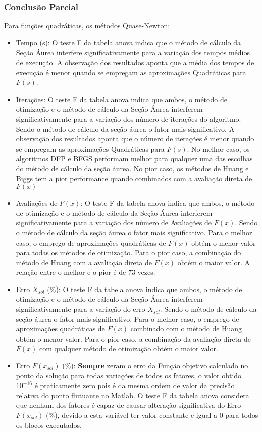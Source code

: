 \subsubsection{Conclusão Parcial}
        Para funções quadráticas, os métodos Quase-Newton:
        \begin{itemize}
            \item {Tempo (s):} O teste F da tabela anova indica que o método de cálculo da Seção Áurea interfere significativamente para a variação dos tempos médios de execução. A observação dos resultados aponta que a média dos tempos de execução é menor quando se empregam as aproximações Quadráticas para $F(s)$.
            \item {Iterações:} O teste F da tabela anova indica que ambos, o método de otimização e o método de cálculo da Seção Áurea interferem significativamente para a variação dos número de iterações do algoritmo. Sendo o método de cálculo da seção áurea o fator mais significativo. A observação dos resultados aponta que o número de iterações é menor quando se empregam as aproximações Quadráticas para $F(s)$. No melhor caso, os algoritmos DFP e BFGS performam melhor para qualquer uma das escolhas do método de cálculo da seção áurea. No pior caso, os métodos de Huang e Biggs tem a pior performance quando combinados com a avaliação direta de $F(x)$
            \item {Avaliações de $F(x)$:} O teste F da tabela anova indica que ambos, o método de otimização e o método de cálculo da Seção Áurea interferem significativamente para a variação dos número de Avaliações de $F(x)$. Sendo o método de cálculo da seção áurea o fator mais significativo. Para o melhor caso, o emprego de aproximações quadráticas de $F(x)$ obtém o menor valor para todas os métodos de otimização. Para o pior caso, a combinação do método de Huang com a avaliação direta de $F(x)$ obtém o maior valor. A relação entre o melhor e o pior é de 73 vezes.
            \item {Erro $X_{sol}$ (\%):} O teste F da tabela anova indica que ambos, o método de otimização e o método de cálculo da Seção Áurea interferem significativamente para a variação do erro $X_{sol}$. Sendo o método de cálculo da seção áurea o fator mais significativo. Para o melhor caso, o emprego de aproximações quadráticas de $F(x)$ combinado com o método de Huang obtém o menor valor. Para o pior caso, a combinação da avaliação direta de $F(x)$ com qualquer método de otimização obtém o maior valor.
            \item {Erro $F(x_{sol})$ (\%):} \textbf{Sempre} zeram o erro da Função objetivo calculado no ponto da solução para todas variações de todos os fatores, o valor obtido $10^{-16}$ é praticamente zero pois é da mesma ordem de valor da precisão relativa do ponto flutuante no Matlab. O teste F da tabela anova considera que nenhum dos fatores é capaz de causar alteração significativa do Erro $F(x_{sol})$ (\%), devido a esta variável ter valor constante e igual a 0 para todos os blocos executados.
        \end{itemize}